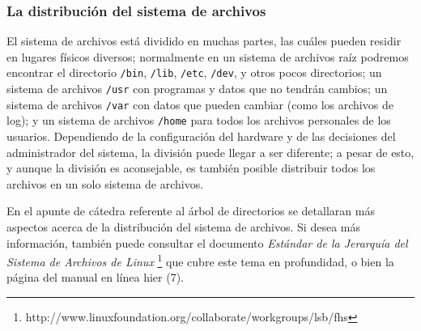 \documentclass[12pt]{article}
\begin{document}
\subsubsection{ La distribución del sistema de archivos}



 El sistema de archivos está dividido en muchas partes, las cuáles pueden residir
en lugares físicos diversos; normalmente en un sistema de archivos raíz podremos 
encontrar el directorio \texttt{/bin}, \texttt{/lib}, \texttt{/etc}, \texttt{/dev},
y otros pocos directorios; un sistema de archivos \texttt{/usr} con programas y datos que
no tendrán cambios; un sistema de archivos \texttt{/var} con datos que pueden cambiar
(como los archivos de log); y un sistema de archivos \texttt{/home}
para todos los archivos personales de los usuarios. Dependiendo de la
configuración del hardware y de las decisiones del administrador del sistema, la
división puede llegar a ser diferente; a pesar de esto, y aunque la división es
aconsejable, es también posible distribuir todos los archivos en un solo sistema
de archivos.  

 En el apunte de cátedra referente al árbol de directorios se detallaran más 
aspectos acerca de la distribución del sistema de archivos. Si desea más información,
también puede consultar el documento \textit{Estándar de la Jerarquía del Sistema de Archivos
de Linux} 
\footnote{http://www.linuxfoundation.org/collaborate/workgroups/lsb/fhs}
que cubre este tema en profundidad, o bien la página del manual en línea hier (7).


\end{document}

